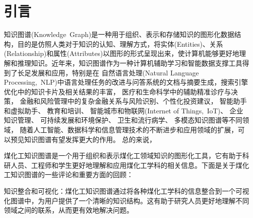 \section{引言}
知识图谱\textrm{(Knowledge~Graph)}是一种用于组织、表示和存储知识的图形化数据结构，目的是仿照人类对于知识的认知、理解方式，将实体\textrm{(Entities)}、关系\textrm{(Relationship)}和属性\textrm{(Attributes)}以图形的形式呈现出来，使计算机能够更好地理解和推理知识。近年来，知识图谱作为一种计算机辅助学习和智能数据支撑工具得到了长足发展和应用，特别是在%
自然语言处理\textrm{(Natural Language Processing,~NLP)}中语言处理任务的改进与问答系统的文档与摘要生成，搜索引擎优化中的知识卡片及相关结果的丰富，%
医疗和生命科学中的辅助精准诊疗与决策，%
金融和风险管理中的复杂金融关系与风险识别、个性化投资建议，%
智能助手和虚拟助手、%
教育和培训、%
智能城市和物联网\textrm{(Internet of Things,~IoT)}、%
企业知识管理、%
可持续发展和环境保护、%
卫生和流行病学、%
多模态知识图谱等不同领域，%
随着人工智能、数据科学和信息管理技术的不断进步和应用领域的扩展，可以预见知识图谱有望发挥更大的作用。
总的来说，

煤化工知识图谱是一个用于组织和表示煤化工领域知识的图形化工具，它有助于科研人员、工程师和学生更好地理解和应用煤化工学科的相关信息。下面是关于煤化工知识图谱的一些评论和重要方面的回顾：

知识整合和可视化：煤化工知识图谱通过将各种煤化工学科的信息整合到一个可视化图谱中，为用户提供了一个清晰的知识结构。这有助于研究人员更好地理解不同领域之间的联系，从而更有效地解决问题。

